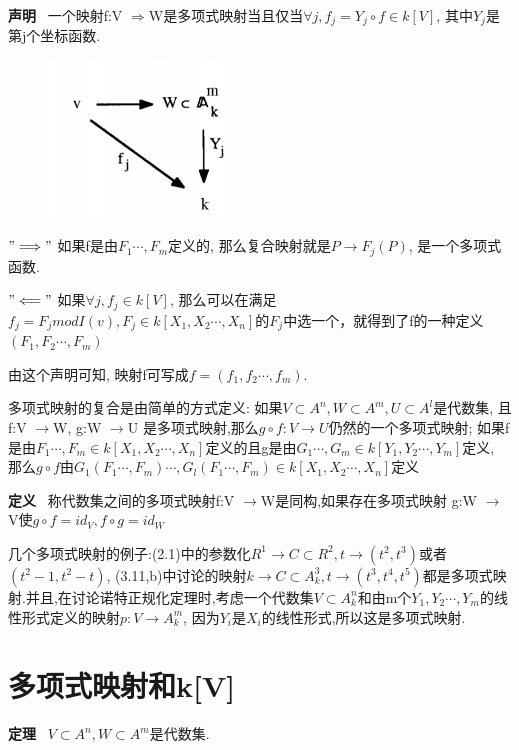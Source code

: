 \documentclass[UTF8]{book}
\begin{document}
\textbf{声明} \ 一个映射f:V $\Rightarrow $W是多项式映射当且仅当$\forall  j, f_{j}=Y_{j}\circ f \in k[V]$, 其中$Y_{j}$是第j个坐标函数.
\begin{figure}[h]
  \centering
  \includegraphics[width=5cm]{68.jpg}\\
\end{figure}


$"\Longrightarrow"$
如果f是由$F_{1}\cdots,F_{m}$定义的, 那么复合映射就是$P\rightarrow F_{j}(P)$, 是一个多项式函数.

$"\Longleftarrow"$
如果$\forall  j, f_{j}\in k[V] $, 那么可以在满足$f_{j}=F_{j} mod I(v), F_{j}\in k[X_{1},X_{2}\cdots,X_{n}]$的$F_{j}$中选一个，就得到了f的一种定义$(F_{1},F_{2}\cdots,F_{m})$

由这个声明可知, 映射f可写成$f=(f_{1},f_{2}\cdots,f_{m})$.

多项式映射的复合是由简单的方式定义: 如果$V\subset A^{n}, W\subset A^{m}, U\subset A^{l}$是代数集, 且f:V $\rightarrow $W, g:W $\rightarrow $U 是多项式映射,那么$g\circ f :V \rightarrow U$仍然的一个多项式映射; 如果f是由$F_{1}\cdots,F_{m}\in k[X_{1},X_{2}\cdots,X_{n}]$定义的且g是由$G_{1}\cdots,G_{m}\in k[Y_{1},Y_{2}\cdots,Y_{m}]$定义, 那么$g\circ f$由$G_{1}(F_{1}\cdots,F_{m})\cdots,G_{l}(F_{1}\cdots,F_{m})\in k[X_{1},X_{2}\cdots,X_{n}]$定义

\textbf{定义} \ 称代数集之间的多项式映射f:V $\rightarrow $W是同构,如果存在多项式映射 g:W $\rightarrow $V使$g\circ f=id_{V}, f\circ g=id_{W}$

几个多项式映射的例子:(2.1)中的参数化$R^{1}\rightarrow C\subset R^{2}, t\rightarrow (t^{2},t^{3})$或者$(t^{2}-1,t^{2}-t)$, (3.11,b)中讨论的映射$k\rightarrow C\subset A^{3}_{k}, t\rightarrow (t^{3},t^{4},t^{5})$都是多项式映射.并且,在讨论诺特正规化定理时,考虑一个代数集$V\subset A^{n}_{k}$和由m个$Y_{1},Y_{2}\cdots,Y_{m}$的线性形式定义的映射$p:V\rightarrow A^{m}_{k}$, 因为$Y_{i}$是$X_{i}$的线性形式,所以这是多项式映射.

\section{多项式映射和k[V]}
\textbf{定理} \ $V\subset A^{n},W\subset A^{m}$是代数集.
\end{document}
